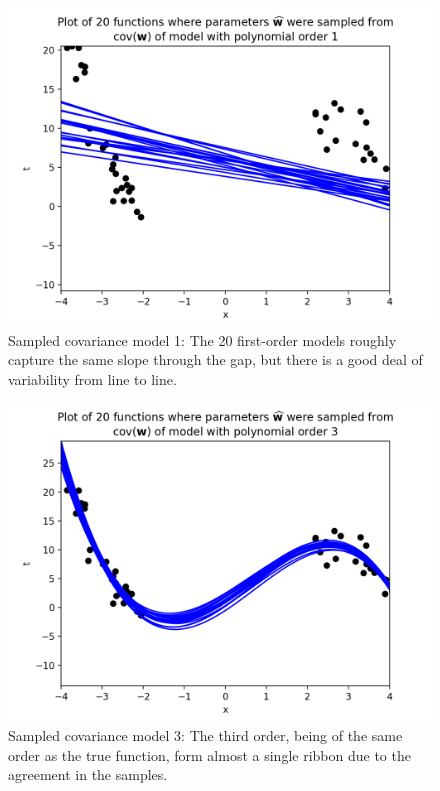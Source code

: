 \documentclass[10pt]{article}
\begin{document}
\begin{itemize}
\begin{figure}[H]
\centering
  \includegraphics[width=\linewidth]{sampled-fns-1.png}
 \caption{Sampled covariance model 1: The 20 first-order models roughly capture the same slope through the gap, but there is a good deal of variability from line to line.}
\label{label}
\end{figure}

\begin{figure}[H]
\centering
  \includegraphics[width=\linewidth]{sampled-fns-3.png}
 \caption{Sampled covariance model 3: The third order, being of the same order as the true function, form almost a single ribbon due to the agreement in the samples.}
\label{label}
\end{figure}


\end{itemize}
\end{document}
